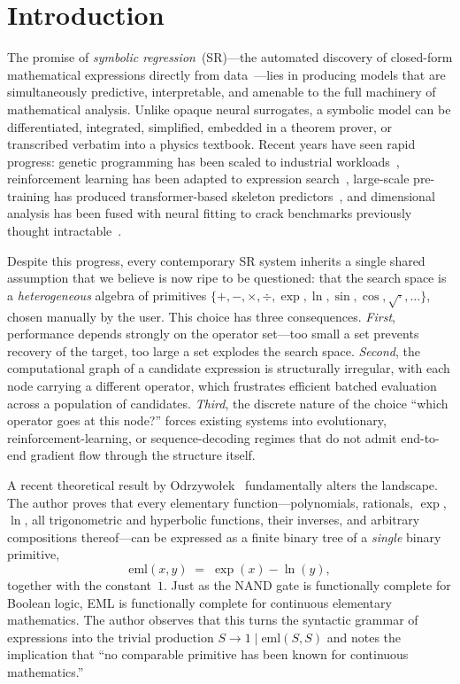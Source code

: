 \documentclass{article}
\begin{document}
\section{Introduction}
\label{sec:introduction}

The promise of \emph{symbolic regression}~(SR)—the automated discovery
of closed-form mathematical expressions directly from
data~\cite{koza1992gp,schmidt2009eureqa}—lies in producing models that
are simultaneously predictive, interpretable, and amenable to the full
machinery of mathematical analysis. Unlike opaque neural surrogates, a
symbolic model can be differentiated, integrated, simplified, embedded
in a theorem prover, or transcribed verbatim into a physics textbook.
Recent years have seen rapid progress: genetic programming has been
scaled to industrial workloads~\cite{cranmer2023pysr}, reinforcement
learning has been adapted to expression search~\cite{petersen2021dsr},
large-scale pre-training has produced transformer-based skeleton
predictors~\cite{biggio2021nesymres,kamienny2022e2e}, and dimensional
analysis has been fused with neural fitting to crack benchmarks
previously thought
intractable~\cite{udrescu2020aifeynman,udrescu2020aifeynman2}.

Despite this progress, every contemporary SR system inherits a single
shared assumption that we believe is now ripe to be questioned: that
the search space is a \emph{heterogeneous} algebra of primitives
$\{+,-,\times,\div,\exp,\ln,\sin,\cos,\sqrt{\cdot},\ldots\}$, chosen
manually by the user. This choice has three consequences. \emph{First},
performance depends strongly on the operator set—too small a set
prevents recovery of the target, too large a set explodes the search
space. \emph{Second}, the computational graph of a candidate expression
is structurally irregular, with each node carrying a different
operator, which frustrates efficient batched evaluation across a
population of candidates. \emph{Third}, the discrete nature of the
choice ``which operator goes at this node?'' forces existing systems
into evolutionary, reinforcement-learning, or sequence-decoding regimes
that do not admit end-to-end gradient flow through the structure
itself.

A recent theoretical result by Odrzywo\l{}ek~\cite{odrzywolek2026eml}
fundamentally alters the landscape. The author proves that every
elementary function—polynomials, rationals, $\exp$, $\ln$, all
trigonometric and hyperbolic functions, their inverses, and arbitrary
compositions thereof—can be expressed as a finite binary tree of a
\emph{single} binary primitive,
\begin{equation}
\mathrm{eml}(x,y) \;=\; \exp(x) - \ln(y),
\label{eq:eml}
\end{equation}
together with the constant~$1$. Just as the NAND gate is functionally
complete for Boolean logic, EML is functionally complete for continuous
elementary mathematics. The author observes that this turns the
syntactic grammar of expressions into the trivial production
$S \to 1 \mid \mathrm{eml}(S,S)$ and notes the implication that ``no
comparable primitive has been known for continuous mathematics.''
\end{document}
